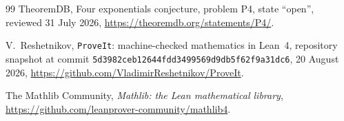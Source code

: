 \documentclass[11pt,oneside]{article}
\theoremstyle{definition}
\newcommand{\commit}[1]{\texttt{#1}}
\begin{document}
\begin{thebibliography}{99}
TheoremDB,
\newblock Four exponentials conjecture, problem P4,
\newblock state ``open'', reviewed 31 July 2026,
\newblock \url{https://theoremdb.org/statements/P4/}.

V.~Reshetnikov,
\newblock \texttt{ProveIt}: machine-checked mathematics in Lean~4,
\newblock repository snapshot at commit
\commit{5d3982ceb12644fdd3499569d9db5f62f9a31dc6}, 20 August 2026,
\newblock \url{https://github.com/VladimirReshetnikov/ProveIt}.

The Mathlib Community,
\newblock \emph{Mathlib: the Lean mathematical library},
\newblock \url{https://github.com/leanprover-community/mathlib4}.

\end{thebibliography}
\end{document}
